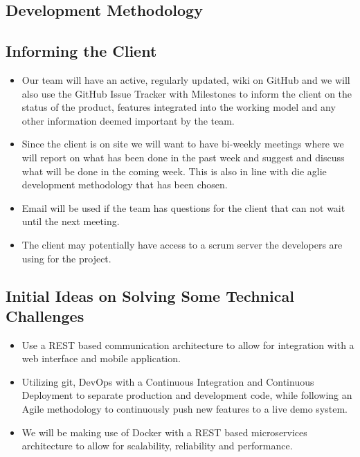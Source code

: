 \subsection{Development Methodology}


\subsection{Informing the Client}
\begin{itemize}
	\item Our team will have an active, regularly updated, wiki on GitHub and we will also use the GitHub Issue Tracker with Milestones to inform the client on the status of the product, features integrated into the working model and any other information deemed important by the team.
	\item Since the client is on site we will want to have bi-weekly meetings where we will report on what has been done in the past week and suggest and discuss what will be done in the coming week. This is also in line with die aglie development methodology that has been chosen.
	\item Email will be used if the team has questions for the client that can not wait until the next meeting.
	\item The client may potentially have access to a scrum server the developers are using for the project.
\end{itemize}

\subsection{Initial Ideas on Solving Some Technical Challenges}
\begin{itemize}
	\item Use a REST based communication architecture to allow for integration with a web interface and mobile application.
	\item Utilizing git, DevOps with a Continuous Integration and Continuous Deployment to separate production and development code, while following an Agile methodology to continuously push new features to a live demo system.
	\item We will be making use of Docker with a REST based microservices architecture to allow for scalability, reliability and performance.
\end{itemize}

